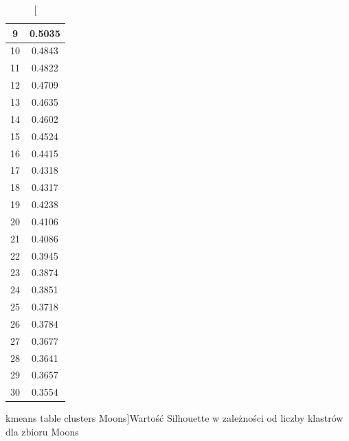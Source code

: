 \documentclass{classrep}
\begin{document}
{{\begin{table}[!htbp]
\begin{minipage}{.24\textwidth}
\begin{tabular}{|c|c|}
                        9 & 0.5035 \\ \hline
                        10 & 0.4843 \\ \hline
                        11 & 0.4822 \\ \hline
                        12 & 0.4709 \\ \hline
                        13 & 0.4635 \\ \hline
                        14 & 0.4602 \\ \hline
                        15 & 0.4524 \\ \hline
                        16 & 0.4415 \\ \hline
                        17 & 0.4318 \\ \hline
                        18 & 0.4317 \\ \hline
                        19 & 0.4238 \\ \hline
                        20 & 0.4106 \\ \hline
                        21 & 0.4086 \\ \hline
                        22 & 0.3945 \\ \hline
                        23 & 0.3874 \\ \hline
                        24 & 0.3851 \\ \hline
                        25 & 0.3718 \\ \hline
                        26 & 0.3784 \\ \hline
                        27 & 0.3677 \\ \hline
                        28 & 0.3641 \\ \hline
                        29 & 0.3657 \\ \hline
                        30 & 0.3554 \\ \hline
                    \end{tabular}
                    \caption
                    [kmeans table clusters Moons]{Wartość Silhouette w zależności od
                    liczby klastrów dla zbioru Moons}
                    \label{kmeans_table_clusters_Moons}
                \end{minipage}
                \hfill

            \end{table}
            \FloatBarrier


}}
\end{document}
